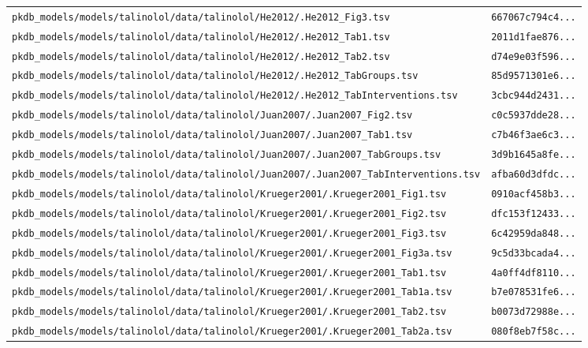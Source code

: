 \documentclass{article}
\begin{document}
\begin{longtable}{ll}
\texttt{pkdb\_models/models/talinolol/data/talinolol/He2012/.He2012\_Fig3.tsv} & \texttt{667067c794c4...} \\
\texttt{pkdb\_models/models/talinolol/data/talinolol/He2012/.He2012\_Tab1.tsv} & \texttt{2011d1fae876...} \\
\texttt{pkdb\_models/models/talinolol/data/talinolol/He2012/.He2012\_Tab2.tsv} & \texttt{d74e9e03f596...} \\
\texttt{pkdb\_models/models/talinolol/data/talinolol/He2012/.He2012\_TabGroups.tsv} & \texttt{85d9571301e6...} \\
\texttt{pkdb\_models/models/talinolol/data/talinolol/He2012/.He2012\_TabInterventions.tsv} & \texttt{3cbc944d2431...} \\
\texttt{pkdb\_models/models/talinolol/data/talinolol/Juan2007/.Juan2007\_Fig2.tsv} & \texttt{c0c5937dde28...} \\
\texttt{pkdb\_models/models/talinolol/data/talinolol/Juan2007/.Juan2007\_Tab1.tsv} & \texttt{c7b46f3ae6c3...} \\
\texttt{pkdb\_models/models/talinolol/data/talinolol/Juan2007/.Juan2007\_TabGroups.tsv} & \texttt{3d9b1645a8fe...} \\
\texttt{pkdb\_models/models/talinolol/data/talinolol/Juan2007/.Juan2007\_TabInterventions.tsv} & \texttt{afba60d3dfdc...} \\
\texttt{pkdb\_models/models/talinolol/data/talinolol/Krueger2001/.Krueger2001\_Fig1.tsv} & \texttt{0910acf458b3...} \\
\texttt{pkdb\_models/models/talinolol/data/talinolol/Krueger2001/.Krueger2001\_Fig2.tsv} & \texttt{dfc153f12433...} \\
\texttt{pkdb\_models/models/talinolol/data/talinolol/Krueger2001/.Krueger2001\_Fig3.tsv} & \texttt{6c42959da848...} \\
\texttt{pkdb\_models/models/talinolol/data/talinolol/Krueger2001/.Krueger2001\_Fig3a.tsv} & \texttt{9c5d33bcada4...} \\
\texttt{pkdb\_models/models/talinolol/data/talinolol/Krueger2001/.Krueger2001\_Tab1.tsv} & \texttt{4a0ff4df8110...} \\
\texttt{pkdb\_models/models/talinolol/data/talinolol/Krueger2001/.Krueger2001\_Tab1a.tsv} & \texttt{b7e078531fe6...} \\
\texttt{pkdb\_models/models/talinolol/data/talinolol/Krueger2001/.Krueger2001\_Tab2.tsv} & \texttt{b0073d72988e...} \\
\texttt{pkdb\_models/models/talinolol/data/talinolol/Krueger2001/.Krueger2001\_Tab2a.tsv} & \texttt{080f8eb7f58c...} \\

\end{longtable}
\end{document}
